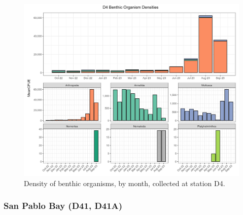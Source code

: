 \documentclass[
]{article}
\begin{document}
\begin{figure}

{\centering \includegraphics[width=9.84in,height=\textheight]{../figures/benthic_bar_d4.jpg}

}

\caption{\label{fig-benthic_d4}Density of benthic organisms, by month,
collected at station D4.}

\end{figure}

\hypertarget{san-pablo-bay-d41-d41a}{%
\subsubsection{San Pablo Bay (D41, D41A)}\label{san-pablo-bay-d41-d41a}}
\end{document}
